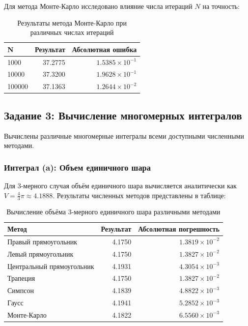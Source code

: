 \documentclass[a4paper]{article}
\begin{document}
Для метода Монте-Карло исследовано влияние числа итераций $N$ на точность:

\begin{table}[H]
\centering
\small
\begin{tabular}{lrr}
\hline
N & Результат & Абсолютная ошибка \\
\hline
1000 & 37.2775 & $1.5385 \times 10^{-1}$ \\
10000 & 37.3200 & $1.9628 \times 10^{-1}$ \\
100000 & 37.1363 & $1.2644 \times 10^{-2}$ \\
\hline
\end{tabular}
\caption{Результаты метода Монте-Карло при различных числах итераций}
\label{tab:mc_results}
\end{table}

\subsection*{Задание 3: Вычисление многомерных интегралов}

Вычислены различные многомерные интегралы всеми доступными численными методами.

\subsubsection*{Интеграл (a): Объем единичного шара}

Для 3-мерного случая объём единичного шара вычисляется аналитически как $V = \frac{4}{3}\pi \approx 4.1888$. Результаты численных методов представлены в таблице:

\begin{table}[H]
\centering
\small
\begin{tabular}{lrr}
\hline
Метод & Результат & Абсолютная погрешность \\
\hline
Правый прямоугольник & 4.1750 & $1.3819 \times 10^{-2}$ \\
Левый прямоугольник & 4.1750 & $1.3827 \times 10^{-2}$ \\
Центральный прямоугольник & 4.1931 & $4.3054 \times 10^{-3}$ \\
Трапеция & 4.1750 & $1.3827 \times 10^{-2}$ \\
Симпсон & 4.1839 & $4.8822 \times 10^{-3}$ \\
Гаусс & 4.1941 & $5.2852 \times 10^{-3}$ \\
Монте-Карло & 4.1822 & $6.5560 \times 10^{-3}$ \\
\hline
\end{tabular}
\caption{Вычисление объёма 3-мерного единичного шара различными методами}
\label{tab:sphere_3d}
\end{table}
\end{document}
